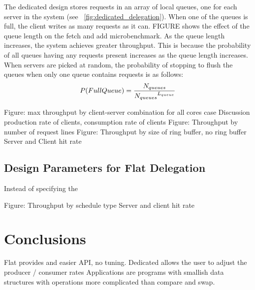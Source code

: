 \documentclass{uicthesi}
\begin{document}
The dedicated design stores requests in an array of local queues, one for each server in the system (see ~\ref{fig:dedicated_delegation}).  When one of the queues is full, the client writes as many requests as it can.  FIGURE shows the effect of the queue length on the fetch and add microbenchmark. As the queue length increases, the system achieves greater throughput. This is because the probability of all queues having any requests present increases as the queue length increases. When servers are picked at random, the probability of stopping to flush the queues when only one queue contains requests is as follows: 
\begin{displaymath}
P(Full Queue) = {N_{queues} \over {N_{queues}}^{L_{queue}}}
\end{displaymath}



Figure: max throughput by client-server combination for all cores case
	Discussion production rate of clients, consumption rate of clients
Figure: Throughput by number of request lines
Figure: Throughput by size of ring buffer, no ring buffer
	Server and Client hit rate

\section{Design Parameters for Flat Delegation}

Instead of specifying the 

Figure: Throughput by schedule type
	Server and client hit rate

\chapter{Conclusions}
Flat provides and easier API, no tuning. 
Dedicated allows the user to adjust the producer / consumer rates
Applications are programs with smallish data structures with operations more complicated than compare and swap. 
\end{document}

